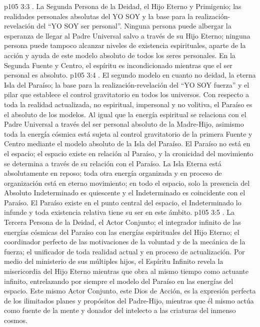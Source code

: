 \vs p105 3:3 . La Segunda Persona de la Deidad, el Hijo Eterno y Primigenio; las realidades personales absolutas del YO SOY y la base para la realización\hyp{}revelación del “YO SOY ser personal”. Ninguna persona puede albergar la esperanza de llegar al Padre Universal salvo a través de su Hijo Eterno; ninguna persona puede tampoco alcanzar niveles de existencia espirituales, aparte de la acción y ayuda de este modelo absoluto de todos los seres personales. En la Segunda Fuente y Centro, el espíritu es incondicionado mientras que el ser personal es absoluto.
\vs p105 3:4 . El segundo modelo en cuanto no deidad, la eterna Isla del Paraíso; la base para la realización\hyp{}revelación del “YO SOY fuerza” y el pilar que establece el control gravitatorio en todos los universos. Con respecto a toda la realidad actualizada, no espiritual, impersonal y no volitiva, el Paraíso es el absoluto de los modelos. Al igual que la energía espiritual se relaciona con el Padre Universal a través del ser personal absoluto de la Madre\hyp{}Hijo, asimismo toda la energía cósmica está sujeta al control gravitatorio de la primera Fuente y Centro mediante el modelo absoluto de la Isla del Paraíso. El Paraíso no está en el espacio; el espacio existe en relación al Paraíso, y la cronicidad del movimiento se determina a través de su relación con el Paraíso. La Isla Eterna está absolutamente en reposo; toda otra energía organizada y en proceso de organización está en eterno movimiento; en todo el espacio, solo la presencia del Absoluto Indeterminado es quiescente y el Indeterminado es coincidente con el Paraíso. El Paraíso existe en el punto central del espacio, el Indeterminado lo infunde y toda existencia relativa tiene su ser en este ámbito.
\vs p105 3:5 . La Tercera Persona de la Deidad, el Actor Conjunto; el integrador infinito de las energías cósmicas del Paraíso con las energías espirituales del Hijo Eterno; el coordinador perfecto de las motivaciones de la voluntad y de la mecánica de la fuerza; el unificador de toda realidad actual y en proceso de actualización. Por medio del ministerio de sus múltiples hijos, el Espíritu Infinito revela la misericordia del Hijo Eterno mientras que obra al mismo tiempo como actuante infinito, entrelazando por siempre el modelo del Paraíso en las energías del espacio. Este mismo Actor Conjunto, este Dios de Acción, es la expresión perfecta de los ilimitados planes y propósitos del Padre\hyp{}Hijo, mientras que él mismo actúa como fuente de la mente y donador del intelecto a las criaturas del inmenso cosmos.
